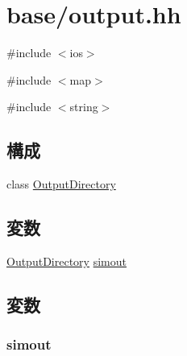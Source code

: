\hypertarget{output_8hh}{
\section{base/output.hh}
\label{output_8hh}
}
{\ttfamily \#include $<$ios$>$}\par
{\ttfamily \#include $<$map$>$}\par
{\ttfamily \#include $<$string$>$}\par
\subsection*{構成}
\begin{DoxyCompactItemize}
\item 
class \hyperlink{classOutputDirectory}{OutputDirectory}
\end{DoxyCompactItemize}
\subsection*{変数}
\begin{DoxyCompactItemize}
\item 
\hyperlink{classOutputDirectory}{OutputDirectory} \hyperlink{output_8hh_a08819d32c217c58b155584845ddadd4a}{simout}
\end{DoxyCompactItemize}


\subsection{変数}
\hypertarget{output_8hh_a08819d32c217c58b155584845ddadd4a}{
\subsubsection[{simout}]{ {\bf simout}}}
\label{output_8hh_a08819d32c217c58b155584845ddadd4a}
